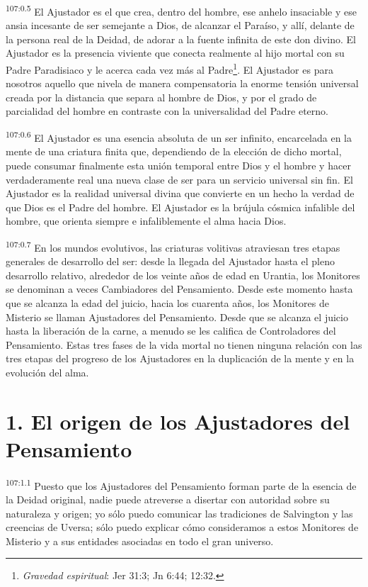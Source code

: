 \par
\textsuperscript{107:0.5} El Ajustador es el que crea, dentro del hombre, ese anhelo insaciable y ese ansia incesante de ser semejante a Dios, de alcanzar el Paraíso, y allí, delante de la persona real de la Deidad, de adorar a la fuente infinita de este don divino. El Ajustador es la presencia viviente que conecta realmente al hijo mortal con su Padre Paradisiaco y le acerca cada vez más al Padre\footnote{\textit{Gravedad espiritual}: Jer 31:3; Jn 6:44; 12:32.}. El Ajustador es para nosotros aquello que nivela de manera compensatoria la enorme tensión universal creada por la distancia que separa al hombre de Dios, y por el grado de parcialidad del hombre en contraste con la universalidad del Padre eterno.

\par
\textsuperscript{107:0.6} El Ajustador es una esencia absoluta de un ser infinito, encarcelada en la mente de una criatura finita que, dependiendo de la elección de dicho mortal, puede consumar finalmente esta unión temporal entre Dios y el hombre y hacer verdaderamente real una nueva clase de ser para un servicio universal sin fin. El Ajustador es la realidad universal divina que convierte en un hecho la verdad de que Dios es el Padre del hombre. El Ajustador es la brújula cósmica infalible del hombre, que orienta siempre e infaliblemente el alma hacia Dios.

\par
\textsuperscript{107:0.7} En los mundos evolutivos, las criaturas volitivas atraviesan tres etapas generales de desarrollo del ser: desde la llegada del Ajustador hasta el pleno desarrollo relativo, alrededor de los veinte años de edad en Urantia, los Monitores se denominan a veces Cambiadores del Pensamiento. Desde este momento hasta que se alcanza la edad del juicio, hacia los cuarenta años, los Monitores de Misterio se llaman Ajustadores del Pensamiento. Desde que se alcanza el juicio hasta la liberación de la carne, a menudo se les califica de Controladores del Pensamiento. Estas tres fases de la vida mortal no tienen ninguna relación con las tres etapas del progreso de los Ajustadores en la duplicación de la mente y en la evolución del alma.

\section*{1. El origen de los Ajustadores del Pensamiento}
\par
\textsuperscript{107:1.1} Puesto que los Ajustadores del Pensamiento forman parte de la esencia de la Deidad original, nadie puede atreverse a disertar con autoridad sobre su naturaleza y origen; yo sólo puedo comunicar las tradiciones de Salvington y las creencias de Uversa; sólo puedo explicar cómo consideramos a estos Monitores de Misterio y a sus entidades asociadas en todo el gran universo.

